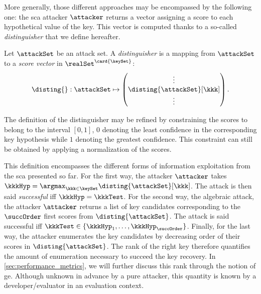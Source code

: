 More generally, those different approaches may be encompassed by the following one: the \gls{sca} attacker \(\attacker\) returns a vector assigning a score to each hypothetical value of the key.
This vector is computed thanks to a so-called \emph{distinguisher} that we define hereafter.
\begin{definition}[Distinguisher]
    \label{def:distinguisher}
    Let \(\attackSet\) be an attack set.
    A \emph{distinguisher} is a mapping from \(\attackSet\) to a \emph{score vector} in \(\realSet^{\card{\keySet}}\):
    \begin{equation}
        \disting{}: \attackSet \mapsto 
        \left(
        \begin{matrix}
			\vdots \\
			\disting{\attackSet}[\kkk] \\
			\vdots
        \end{matrix}
        \right).
    \end{equation}
\end{definition}
\begin{remark}
    The definition of the distinguisher may be refined by constraining the scores to belong to the interval \([0,1]\), \(0\) denoting the least confidence in the corresponding key hypothesis while \(1\) denoting the greatest confidence.
    This constraint can still be obtained by applying a normalization of the scores.
\end{remark}
This definition encompasses the different forms of information exploitation from the \gls{sca} presented so far.
For the first way, the attacker \(\attacker\) takes \(\kkkHyp = \argmax_{\kkk \in \keySet} \disting{\attackSet}[\kkk]\).
The attack is then said \emph{successful} \gls{iff} \(\kkkHyp = \kkkTest\).
For the second way, \ie{} the algebraic attack, the attacker \(\attacker\) returns a list of key candidates corresponding to the \(\succOrder\) first scores from \(\disting{\attackSet}\).
The attack is said successful \gls{iff} \(\kkkTest \in \{\kkkHyp_1, \ldots, \kkkHyp_\succOrder\}\).
Finally, for the last way, the attacker enumerates the key candidates by decreasing order of their scores in \(\disting{\attackSet}\).
The rank of the right key therefore quantifies the amount of enumeration necessary to succeed the key recovery.
In \autoref{sec:performance_metrics}, we will further discuss this rank through the notion of \gls{ge}.
Although unknown in advance by a pure attacker, this quantity is known by a developer/evaluator in an evaluation context.

